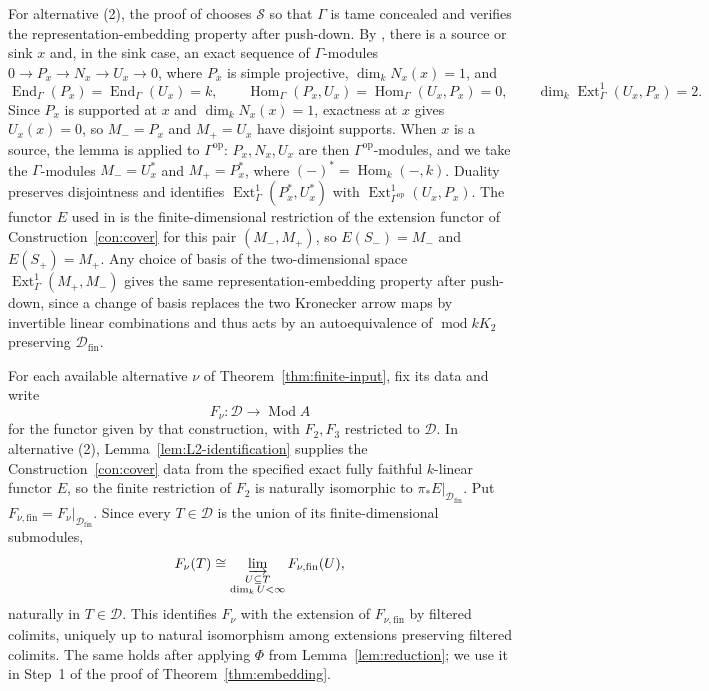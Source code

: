 \documentclass[a4paper,reqno,10pt]{amsart}
\theoremstyle{definition}
\DeclareMathOperator{\Hom}{Hom}
\DeclareMathOperator{\End}{End}
\DeclareMathOperator{\Ext}{Ext}
\DeclareMathOperator{\Mod}{Mod}
\DeclareMathOperator{\md}{mod}
\newcommand{\dm}{\dim_k}
\newcommand{\D}{\mathcal D}
\numberwithin{equation}{section}
\begin{document}
For alternative (2), the proof of \cite[Theorem~7]{Bongartz} chooses
$\mathcal S$ so that $\Gamma$ is tame concealed and verifies the
representation-embedding property after push-down.
By \cite[Lemma~5 and its proof]{Bongartz}, there is a source or sink $x$
and, in the sink case, an exact sequence of $\Gamma$-modules
$0\to P_x\to N_x\to U_x\to0$, where $P_x$ is simple projective,
$\dm N_x(x)=1$, and
\[
 \End_\Gamma(P_x)=\End_\Gamma(U_x)=k,\qquad
 \Hom_\Gamma(P_x,U_x)=\Hom_\Gamma(U_x,P_x)=0,\qquad
 \dm\Ext^1_\Gamma(U_x,P_x)=2.
\]
Since $P_x$ is supported at $x$ and $\dm N_x(x)=1$, exactness at $x$ gives $U_x(x)=0$, so $M_-=P_x$ and $M_+=U_x$
have disjoint supports. When $x$ is a source, the lemma is applied to
$\Gamma^{\mathrm{op}}$: $P_x,N_x,U_x$ are then
$\Gamma^{\mathrm{op}}$-modules, and we take the $\Gamma$-modules
$M_-=U_x^*$ and $M_+=P_x^*$, where $(-)^*=\Hom_k(-,k)$.
Duality preserves disjointness and identifies
$\Ext^1_\Gamma(P_x^*,U_x^*)$ with
$\Ext^1_{\Gamma^{\mathrm{op}}}(U_x,P_x)$.
The functor $E$ used in \cite[proof of Theorem~7]{Bongartz} is the
finite-dimensional restriction of the extension functor of Construction~\ref{con:cover} for this pair
$(M_-,M_+)$, so $E(S_-)=M_-$ and $E(S_+)=M_+$.
Any choice of basis of the two-dimensional space $\Ext^1_\Gamma(M_+,M_-)$ gives
the same representation-embedding property after push-down, since a change
of basis replaces the two Kronecker arrow maps by invertible linear
combinations and thus acts by an autoequivalence of $\md kK_2$ preserving $\D_{\mathrm{fin}}$.

For each available alternative $\nu$ of Theorem~\ref{thm:finite-input},
fix its data and write
\begin{equation}\label{eq:chosen-functors}
 F_\nu:\D\longrightarrow\Mod A
\end{equation}
for the functor given by that construction, with $F_2,F_3$ restricted to $\D$.
In alternative (2), Lemma~\ref{lem:L2-identification} supplies the
Construction~\ref{con:cover} data from the specified exact fully faithful
$k$-linear functor $E$, so the finite restriction of $F_2$ is naturally
isomorphic to $\pi_*E|_{\D_{\mathrm{fin}}}$.
Put $F_{\nu,\mathrm{fin}}=F_\nu|_{\D_{\mathrm{fin}}}$. Since every
$T\in\D$ is the union of its finite-dimensional submodules,
\begin{equation}\label{eq:colimit-comparison}
 F_\nu(T)\cong\varinjlim_{\substack{U\subseteq T\\\dm U<\infty}}
 F_{\nu,\mathrm{fin}}(U),
\end{equation}
naturally in $T\in\D$. This identifies $F_\nu$ with the extension
of $F_{\nu,\mathrm{fin}}$ by filtered colimits, uniquely up to natural
isomorphism among extensions preserving filtered colimits. The same holds after
applying $\Phi$ from Lemma~\ref{lem:reduction}; we use it in Step~1
of the proof of Theorem~\ref{thm:embedding}.
\end{document}
